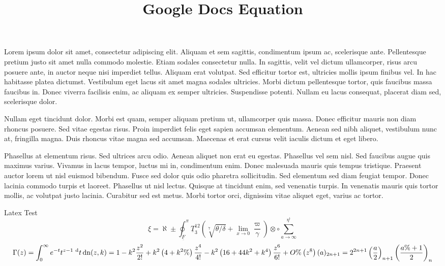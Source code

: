 \documentclass[10pt]{article}
\title{Google Docs Equation }
\author{}
\date{}
\begin{document}
\maketitle
Lorem ipsum dolor sit amet, consectetur adipiscing elit. Aliquam et sem sagittis, condimentum ipsum ac, scelerisque ante. Pellentesque pretium justo sit amet nulla commodo molestie. Etiam sodales consectetur nulla. In sagittis, velit vel dictum ullamcorper, risus arcu posuere ante, in auctor neque nisi imperdiet tellus. Aliquam erat volutpat. Sed efficitur tortor est, ultricies mollis ipsum finibus vel. In hac habitasse platea dictumst. Vestibulum eget lacus sit amet magna sodales ultricies. Morbi dictum pellentesque tortor, quis faucibus massa faucibus in. Donec viverra facilisis enim, ac aliquam ex semper ultricies. Suspendisse potenti. Nullam eu lacus consequat, placerat diam sed, scelerisque dolor.

Nullam eget tincidunt dolor. Morbi est quam, semper aliquam pretium ut, ullamcorper quis massa. Donec efficitur mauris non diam rhoncus posuere. Sed vitae egestas risus. Proin imperdiet felis eget sapien accumsan elementum. Aenean sed nibh aliquet, vestibulum nunc at, fringilla magna. Duis rhoncus vitae magna sed accumsan. Maecenas et erat cursus velit iaculis dictum et eget libero.

Phasellus at elementum risus. Sed ultrices arcu odio. Aenean aliquet non erat eu egestas. Phasellus vel sem nisl. Sed faucibus augue quis maximus varius. Vivamus in lacus tempor, luctus mi in, condimentum enim. Donec malesuada mauris quis tempus tristique. Praesent auctor lorem ut nisl euismod bibendum. Fusce sed dolor quis odio pharetra sollicitudin. Sed elementum sed diam feugiat tempor. Donec lacinia commodo turpis et laoreet. Phasellus ut nisl lectus. Quisque at tincidunt enim, sed venenatis turpis. In venenatis mauris quis tortor mollis, ac volutpat justo lacinia. Curabitur sed est metus. Morbi tortor orci, dignissim vitae aliquet eget, varius ac tortor.

Latex Test
$$
\xi=\aleph \pm \oint_{\underline{F}}^{\pi} \underline{T}_{3}^{12}\left(\sqrt[7]{\theta / \delta}+\lim _{x \rightarrow 0} \frac{\varpi}{\gamma}\right) \otimes \circ \sum_{a \rightarrow \infty}^{\eta^{\iota}}
$$
$$
\Gamma(z)=\int_{0}^{\infty} e^{-t} t^{z-1 \mathrm{~d}} t \\
\operatorname{dn}(z, k)=1-k^{2} \frac{z^{2}}{2 !}+k^{2}\left(4+k^{2} \%\right) \frac{z^{4}}{4 !}-k^{2}\left(16+44 k^{2}+k^{4}\right) \frac{z^{6}}{6 !}+O \%\left(z^{8}\right) \\
(a)_{2 n+1}=2^{2 n+1}\left(\frac{a}{2}\right)_{n+1}\left(\frac{a \%+1}{2}\right)_{n}
$$
\end{document}
